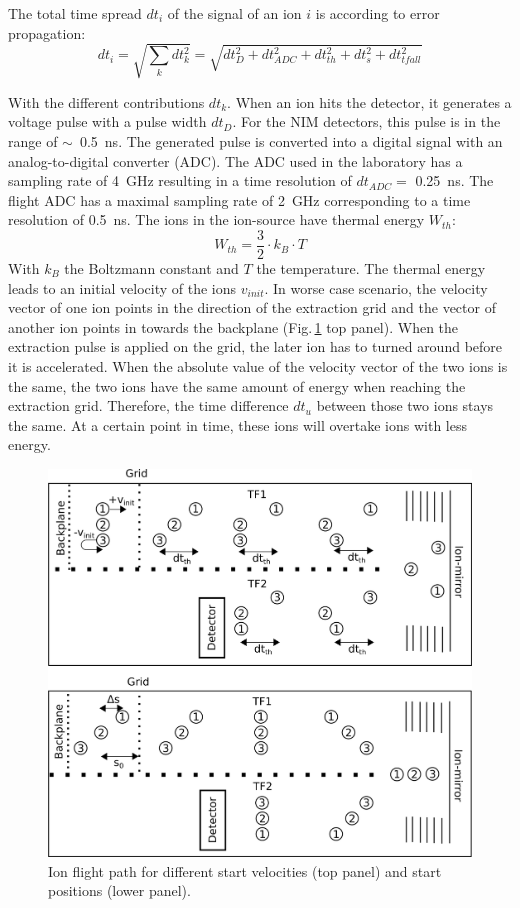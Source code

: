 	The total time spread $dt_i$ of the signal of an ion $i$ is according to error propagation:
	\begin{equation}
		dt_i = \sqrt{\sum_{k} dt_k^2} = \sqrt{dt_D^2 + dt_{ADC}^2 +dt_{th}^2 + dt_{s}^2 + dt_{tfall}^2} 
	\end{equation}
	
	With the different contributions $dt_k$. When an ion hits the detector, it generates a voltage pulse with a pulse width $dt_D$. For the NIM detectors, this pulse is in the range of $\sim$~0.5~ns.	The generated pulse is converted into a digital signal with an analog-to-digital converter (ADC). The ADC used in the laboratory has a sampling rate of 4~GHz resulting in a time resolution of $dt_{ADC} =$ 0.25~ns. The flight ADC has a maximal sampling rate of 2~GHz corresponding to a time resolution of 0.5~ns. The ions in the ion-source have thermal energy $W_{th}$:
	\begin{equation}
		W_{th} = \frac{3}{2}\cdot k_B \cdot T
	\end{equation}
	With $k_B$ the Boltzmann constant and $T$ the temperature. The thermal energy leads to an initial velocity of the ions $v_{init}$. In worse case scenario, the velocity vector of one ion points in the direction of the extraction grid and the vector of another ion points in towards the backplane (Fig.\,\ref{fig:thISStartPosThermEn} top panel). When the extraction pulse is applied on the grid, the later ion has to turned around before it is accelerated. When the absolute value of the velocity vector of the two ions is the same, the two ions have the same amount of energy when reaching the extraction grid. Therefore, the time difference $dt_u$ between those two ions stays the same. At a certain point in time, these ions will overtake ions with less energy. \\	
	\begin{figure}[h]
		\centering
		\includegraphics[width=.5\textwidth]{Bilder/ISStartPosThermEn.png}
		\caption{Ion flight path for different start velocities (top panel) and start positions (lower panel).}
		\label{fig:thISStartPosThermEn}
	\end{figure}
